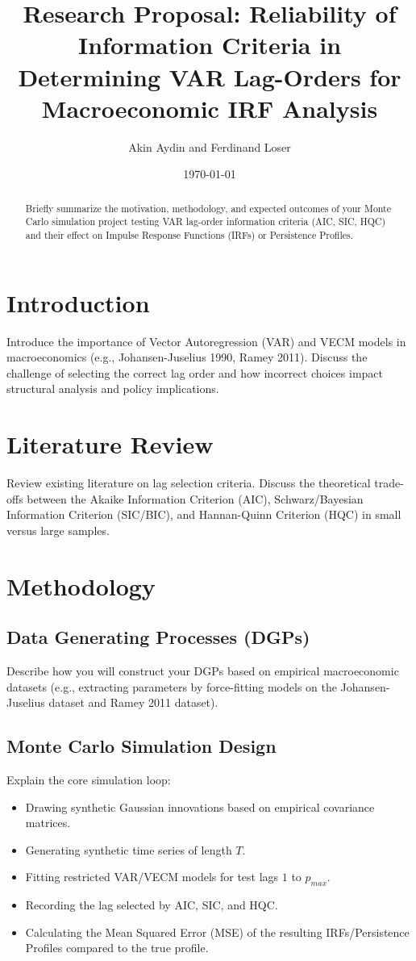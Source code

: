 \documentclass[12pt]{article}
\title{Research Proposal: Reliability of Information Criteria in Determining VAR Lag-Orders for Macroeconomic IRF Analysis}
\author{Akin Aydin and Ferdinand Loser}
\date{\today}
\begin{document}
\maketitle

\begin{abstract}
Briefly summarize the motivation, methodology, and expected outcomes of your Monte Carlo simulation project testing VAR lag-order information criteria (AIC, SIC, HQC) and their effect on Impulse Response Functions (IRFs) or Persistence Profiles.
\end{abstract}

\section{Introduction}
Introduce the importance of Vector Autoregression (VAR) and VECM models in macroeconomics (e.g., Johansen-Juselius 1990, Ramey 2011). Discuss the challenge of selecting the correct lag order and how incorrect choices impact structural analysis and policy implications.

\section{Literature Review}
Review existing literature on lag selection criteria. Discuss the theoretical trade-offs between the Akaike Information Criterion (AIC), Schwarz/Bayesian Information Criterion (SIC/BIC), and Hannan-Quinn Criterion (HQC) in small versus large samples. 

\section{Methodology}

\subsection{Data Generating Processes (DGPs)}
Describe how you will construct your DGPs based on empirical macroeconomic datasets (e.g., extracting parameters by force-fitting models on the Johansen-Juselius dataset and Ramey 2011 dataset).

\subsection{Monte Carlo Simulation Design}
Explain the core simulation loop:
\begin{itemize}
    \item Drawing synthetic Gaussian innovations based on empirical covariance matrices.
    \item Generating synthetic time series of length $T$.
    \item Fitting restricted VAR/VECM models for test lags $1$ to $p_{max}$.
    \item Recording the lag selected by AIC, SIC, and HQC.
    \item Calculating the Mean Squared Error (MSE) of the resulting IRFs/Persistence Profiles compared to the true profile.
\end{itemize}
\end{document}
